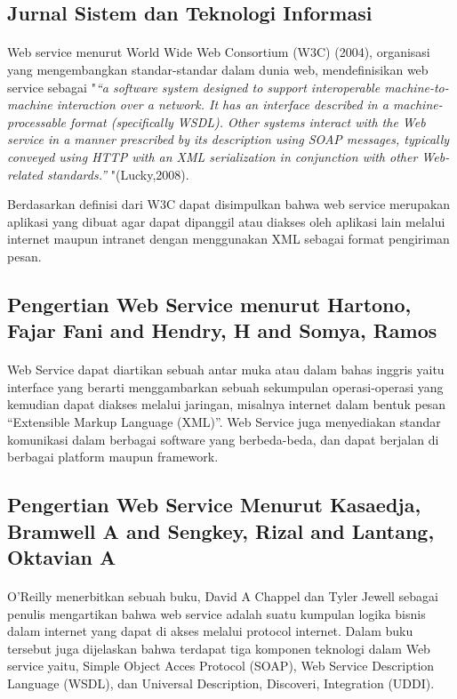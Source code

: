 \documentclass[12pt]{article}
\begin{document}
\subsection{Jurnal Sistem dan Teknologi Informasi}
\paragraph{}
Web service menurut World Wide Web Consortium (W3C) (2004), organisasi yang mengembangkan standar-standar dalam dunia web, mendefinisikan web service sebagai "\textit{“a software system designed to support interoperable machine-to-machine interaction over a network. It has an interface described in a machine-processable format (specifically WSDL). Other systems interact with the Web service in a manner prescribed by its description using SOAP messages, typically conveyed using HTTP with an XML serialization in conjunction with other Web-related standards.” }"(Lucky,2008).

Berdasarkan definisi dari W3C dapat disimpulkan bahwa web service merupakan aplikasi yang dibuat agar dapat dipanggil atau diakses oleh aplikasi lain melalui internet maupun intranet dengan menggunakan XML sebagai format pengiriman pesan\cite{prasetya2013perancangan}.

\subsection{Pengertian Web Service menurut Hartono, Fajar Fani and Hendry, H and Somya, Ramos}
\paragraph{}
Web Service dapat diartikan sebuah antar muka atau dalam bahas inggris yaitu interface  yang berarti menggambarkan sebuah sekumpulan operasi-operasi yang kemudian dapat diakses melalui jaringan, misalnya internet dalam bentuk pesan “Extensible Markup Language (XML)”. Web Service juga menyediakan standar komunikasi dalam berbagai software yang berbeda-beda, dan dapat berjalan di berbagai platform maupun framework\cite{hartono2013aplikasi}.

\subsection{Pengertian Web Service Menurut Kasaedja, Bramwell A and Sengkey, Rizal and Lantang, Oktavian A}
\paragraph{}
O’Reilly menerbitkan sebuah buku, David A Chappel dan Tyler Jewell sebagai penulis mengartikan bahwa web service adalah suatu kumpulan logika bisnis dalam internet yang dapat di akses melalui protocol internet. Dalam buku tersebut juga dijelaskan bahwa terdapat tiga komponen teknologi dalam Web service yaitu, Simple Object Acces Protocol (SOAP), Web Service Description Language (WSDL), dan Universal Description, Discoveri, Integration (UDDI)\cite{kasaedja2014rancang}.
\end{document}
